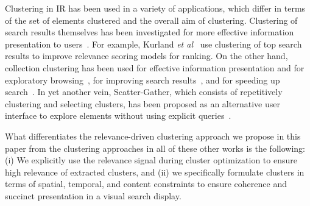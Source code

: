 Clustering in IR has been used in a variety of applications, which differ in terms of the set of elements clustered and the overall aim of clustering. 
Clustering of search results themselves has been investigated for more effective information presentation to users~\cite{Altingovde2008,Can2004,Toda2005,Levi2018}. For example, Kurland {\it et al}~\cite{Kurland2011,Kurland2009} use clustering of top search results to improve relevance scoring models for ranking.
On the other hand, collection clustering has been used for effective information presentation and for exploratory browsing~\cite{McKeown2002,Hatzivassiloglou2000}, for improving search results~\cite{Liu2004,Altingovde2007}, and for speeding up search~\cite{Salton1971,Qumsiyeh2015,Dimond2015}.
In yet another vein, Scatter-Gather, which consists of repetitively clustering and selecting clusters, has been proposed as an alternative user interface to explore elements without using explicit queries~\cite{Cutting1992,Pirolli2007}.

What differentiates the relevance-driven clustering approach we propose in this paper from the clustering approaches in all of these other works is the following: (i) We explicitly use the relevance signal during cluster optimization to ensure high relevance of extracted clusters, and (ii) we specifically formulate clusters in terms of spatial, temporal, and content constraints to ensure coherence and succinct presentation in a visual search display.






